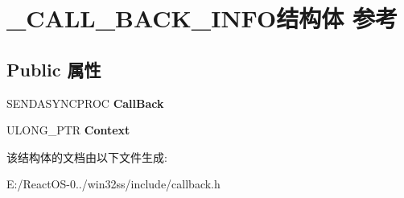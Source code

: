 \hypertarget{struct___c_a_l_l___b_a_c_k___i_n_f_o}{}\section{\+\_\+\+C\+A\+L\+L\+\_\+\+B\+A\+C\+K\+\_\+\+I\+N\+F\+O结构体 参考}
\label{struct___c_a_l_l___b_a_c_k___i_n_f_o}
\subsection*{Public 属性}
\begin{DoxyCompactItemize}
\item 
\mbox{\label{struct___c_a_l_l___b_a_c_k___i_n_f_o_a65eba8012fd528553ef068b36228eb88}} 
S\+E\+N\+D\+A\+S\+Y\+N\+C\+P\+R\+OC {\bfseries Call\+Back}
\item 
\mbox{\label{struct___c_a_l_l___b_a_c_k___i_n_f_o_ac01b36a88b1deb247c1bcc25006e0b0f}} 
U\+L\+O\+N\+G\+\_\+\+P\+TR {\bfseries Context}
\end{DoxyCompactItemize}


该结构体的文档由以下文件生成\+:\begin{DoxyCompactItemize}
\item 
E\+:/\+React\+O\+S-\/0../win32ss/include/callback.\+h\end{DoxyCompactItemize}

